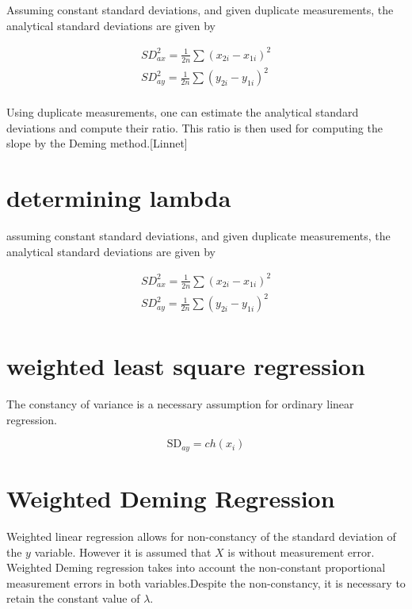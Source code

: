 \documentclass[12pt, a4paper]{report}
\theoremstyle{plain}
\theoremstyle{definition}
\theoremstyle{remark}
\begin{document}
Assuming constant standard deviations, and given duplicate measurements, the analytical standard deviations are given by

\begin{eqnarray*}
	SD^{2}_{ax} = \frac{1}{2n} \sum (x_{2i} - x_{1i})^{2}\\
	SD^{2}_{ay} = \frac{1}{2n} \sum (y_{2i} - y_{1i})^{2}\\
\end{eqnarray*}

Using duplicate measurements, one can estimate the analytical
standard deviations and compute their ratio. This ratio is then
used for computing the slope by the Deming method.[Linnet]

\section{determining lambda}
assuming constant standard deviations, and given duplicate
measurements, the analytical standard deviations are given by

\begin{eqnarray*}
	SD^{2}_{ax} = \frac{1}{2n} \sum (x_{2i} - x_{1i})^{2}\\
	SD^{2}_{ay} = \frac{1}{2n} \sum (y_{2i} - y_{1i})^{2}\\
\end{eqnarray*}


\section{weighted least square regression}
The constancy of variance is a necessary assumption for ordinary
linear regression.

\begin{equation}
	\mbox{SD}_{ay}  = ch(x_{i})
\end{equation}

\section{Weighted Deming Regression}

Weighted linear regression allows for non-constancy of the standard deviation of the $y$ variable. However it is assumed that $X$ is without measurement error. Weighted Deming regression takes into account the non-constant proportional measurement errors in both variables.Despite the non-constancy, it is necessary to retain the constant value of $\lambda$.
\end{document}
